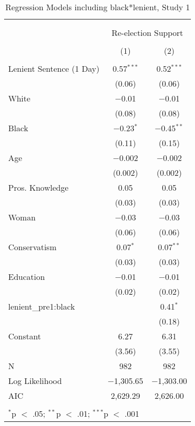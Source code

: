 \documentclass[12pt,letterpaper]{article}
\begin{document}
\begin{table}[!htbp] \centering   \caption{Regression Models including black*lenient, Study 1}   \label{} \begin{tabular}{@{\extracolsep{5pt}}lcc} \\[-1.8ex]\hline \\[-1.8ex] \\[-1.8ex] & \multicolumn{2}{c}{Re-election Support} \\ \\[-1.8ex] & (1) & (2)\\ \hline \\[-1.8ex]  Lenient Sentence (1 Day) & 0.57$^{***}$ & 0.52$^{***}$ \\   & (0.06) & (0.06) \\   White & $-$0.01 & $-$0.01 \\   & (0.08) & (0.08) \\   Black & $-$0.23$^{*}$ & $-$0.45$^{**}$ \\   & (0.11) & (0.15) \\   Age & $-$0.002 & $-$0.002 \\   & (0.002) & (0.002) \\   Pros. Knowledge & 0.05 & 0.05 \\   & (0.03) & (0.03) \\   Woman & $-$0.03 & $-$0.03 \\   & (0.06) & (0.06) \\   Conservatism & 0.07$^{*}$ & 0.07$^{**}$ \\   & (0.03) & (0.03) \\   Education & $-$0.01 & $-$0.01 \\   & (0.02) & (0.02) \\   lenient\_pre1:black &  & 0.41$^{*}$ \\   &  & (0.18) \\   Constant & 6.27 & 6.31 \\   & (3.56) & (3.55) \\  N & 982 & 982 \\ Log Likelihood & $-$1,305.65 & $-$1,303.00 \\ AIC & 2,629.29 & 2,626.00 \\ \hline \\[-1.8ex] \multicolumn{3}{l}{$^{*}$p $<$ .05; $^{**}$p $<$ .01; $^{***}$p $<$ .001} \\ \end{tabular} \end{table} 
\end{document}
